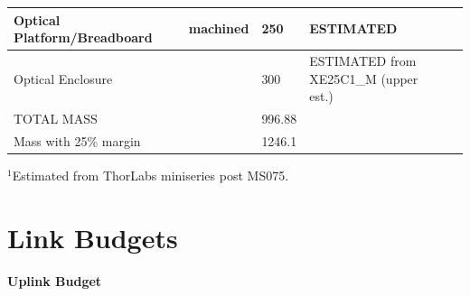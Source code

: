 \documentclass[12pt]{article}
\begin{document}
\begin{landscape}
\begin{center}
\begin{longtable}{| p{3.25cm} | p{2.2cm} | p{3cm} | p{1.75cm} | p{2.5cm} | p{1.55cm} | p{5cm} |}
    Optical Platform/Breadboard &       & machined & 250   & ESTIMATED &       &  \\ \hline
    Optical Enclosure &       &       & 300   & ESTIMATED from XE25C1\_M (upper est.) &       &  \\ \hline
    TOTAL MASS &       &       & 996.88 &       &       &  \\
    Mass with 25\% margin &       &       & 1246.1 &       &       &  \\ \hline
\hline
\end{longtable}
$^1$Estimated from ThorLabs miniseries post MS075.
\end{center}
\end{landscape}

\clearpage



\section{Link Budgets} \label{app:link_budgets}
\textbf{Uplink Budget}
\small
\end{document}

